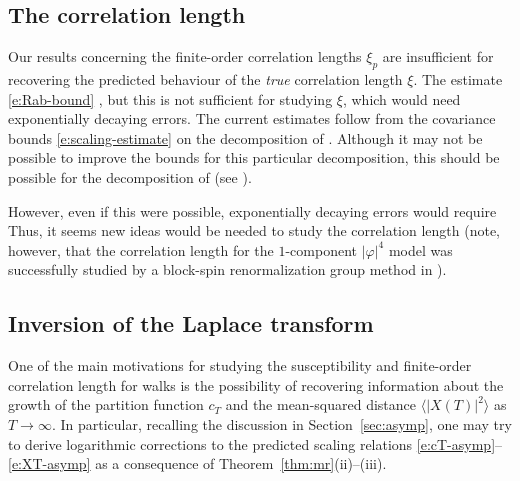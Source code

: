 
\subsection{The correlation length}

Our results concerning the finite-order correlation lengths $\xi_p$ are insufficient
for recovering the predicted behaviour of the \emph{true} correlation length $\xi$.
The estimate \eqref{e:Rab-bound}
, but this is not
sufficient for studying $\xi$, which would need exponentially decaying errors.
The current estimates follow from the covariance bounds \eqref{e:scaling-estimate}
on the decomposition of \cite{Baue13a}. Although it may not be possible to improve
the bounds for this particular decomposition, this should be possible for the
decomposition of \cite{BGM04} (see \cite[p.~445]{BGM04}).

However, even if this were possible, exponentially decaying errors would require
Thus, it seems new ideas would be needed to study the correlation length (note,
however, that the correlation length for the $1$-component $|\varphi|^4$ model
was successfully studied by a block-spin renormalization group method in \cite{HT87}).


\subsection{Inversion of the Laplace transform}

One of the main motivations for studying the
susceptibility and finite-order correlation length for walks is the possibility
of recovering information about the growth of the partition function $c_T$ and
the mean-squared distance $\langle |X(T)|^2 \rangle$ as $T\to\infty$. In
particular, recalling the discussion in Section~\ref{sec:asymp}, one may
try to derive logarithmic corrections to the predicted scaling relations
\eqref{e:cT-asymp}--\eqref{e:XT-asymp} as a consequence of Theorem~\ref{thm:mr}(ii)--(iii).

